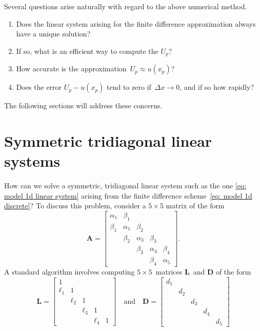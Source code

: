Several questions arise naturally with regard to the above numerical method.
\begin{enumerate}
\item Does the linear system arising for the finite difference approximation 
always have a unique solution?
\item If so, what is an efficient way to compute the $U_p$?
\item How accurate is the approximation~$U_p\approx u(x_p)$?
\item Does the error $U_p-u(x_p)$ tend to zero if~$\Delta x\to0$, and if so how 
rapidly?
\end{enumerate}
The following sections will address these concerns.

\section{Symmetric tridiagonal linear systems}
\label{sec: sym tridiagonal}
How can we solve a symmetric, tridiagonal linear system such as the one
\eqref{eq: model 1d linear system} arising from the finite difference 
scheme~\eqref{eq: model 1d discrete}?  To discuss this problem, consider a 
$5\times5$ matrix of the form
\begin{equation}\label{eq: A symm tridiagonal}
\boldsymbol{A}=\begin{bmatrix}
\alpha_1& \beta_1&        &        &\\
 \beta_1&\alpha_1& \beta_2&        &\\
        & \beta_2&\alpha_3&\beta_3 &\\
        &        & \beta_3&\alpha_4&\beta_4\\
        &        &        & \beta_4&\alpha_5
\end{bmatrix}.
\end{equation}
A standard algorithm involves computing $5\times5$~matrices 
$\boldsymbol{L}$~and $\boldsymbol{D}$ of the form
\[
\boldsymbol{L}=\begin{bmatrix}
     1&      &      &      &\\
\ell_1&     1&      &      &\\
      &\ell_2&     1&      &\\
      &      &\ell_3&     1&\\
      &      &      &\ell_4&1
  \end{bmatrix}
\quad\text{and}\quad
\boldsymbol{D}=\begin{bmatrix}
d_1&   &   &   &\\
   &d_2&   &   &\\
   &   &d_3&   &\\
   &   &   &d_4&\\
   &   &   &   &d_5
  \end{bmatrix}
\]
